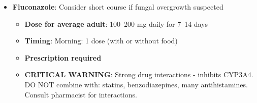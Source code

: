 \begin{enumerate}
\begin{itemize}
\begin{itemize}
            \item \textbf{Contraindications}: Pregnancy (may cause uterine contractions), breastfeeding (insufficient safety data). Use caution in severe liver disease.
            \item \textbf{Monitoring}: If diabetic, monitor blood glucose. If on multiple medications, consult pharmacist regarding CYP3A4 interactions.
            \item \textbf{Timing}: Morning: 1 dose (15 min before breakfast), Midday: 1 dose (15 min before lunch), Evening: 1 dose (15 min before dinner)
            \item \textbf{First dose can be taken 15 minutes before next meal}
        \end{itemize}

        \item \textbf{Fluconazole}: Consider short course if fungal overgrowth suspected
        \begin{itemize}
            \item \textbf{Dose for average adult}: 100--200 mg daily for 7--14 days
            \item \textbf{Timing}: Morning: 1 dose (with or without food)
            \item \textbf{Prescription required}
            \item \textbf{CRITICAL WARNING}: Strong drug interactions - inhibits CYP3A4. DO NOT combine with: statins, benzodiazepines, many antihistamines. Consult pharmacist for interactions.
        \end{itemize}
    \end{itemize}


\end{enumerate}
